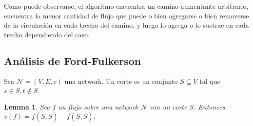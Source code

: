 \documentclass[a4paper, 12pt]{article}
\newtheorem{lemma}{Lemma}
\newtheorem{lemma}{Lemma}
\begin{document}
Como puede observarse, el algoritmo encuentra un camino aumentante arbitrario,
encuentra la menor cantidad de flujo que puede o bien agregarse o bien removerse
de la circulación en cada trecho del camino, y luego lo agrega o lo sustrae en
cada trecho dependiendo del caso.

\subsection{Análisis de Ford-Fulkerson}

\begin{definition}
    Sea $\mathcal{N} = (V, E, c)$ una network. Un corte es un conjunto $S
    \subseteq V$ tal que $s \in S, t \not\in S$.
\end{definition}

\begin{lemma}
    Sea $f$ un flujo sobre una network $\mathcal{N}$ con un corte $S$. Entonces
    $v(f) = f(S, \overline{S}) - f(\overline{S}, S)$.
\end{lemma}
\end{document}
